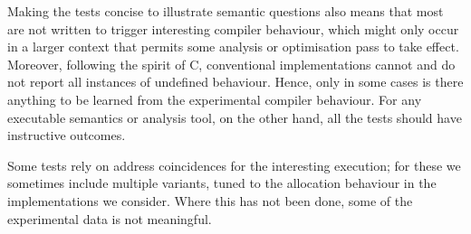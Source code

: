 \documentclass[acmsmall,review,screen]{acmart}\settopmatter{printfolios=true,printccs=false,printacmref=false}
\begin{document}
Making the tests concise to illustrate semantic questions also means
that most are not written to trigger interesting compiler behaviour,
which might only occur in a larger context that permits some analysis
or optimisation pass to take effect. Moreover, following the spirit of
C, conventional implementations cannot and do not report all instances
of undefined behaviour. Hence, only in some cases is there anything to
be learned from the experimental compiler behaviour. For any
executable semantics or analysis tool, on the other hand, all the
tests should have instructive outcomes.

Some tests rely on address coincidences for the interesting execution;
for these we sometimes include multiple variants, tuned to the
allocation behaviour in the implementations we consider. Where this
has not been done, some of the experimental data is not meaningful.


\makeatletter
\setlength{}
\setlength{\@ACM@labelwidth}{6.5pt}
\makeatother

\end{document}
